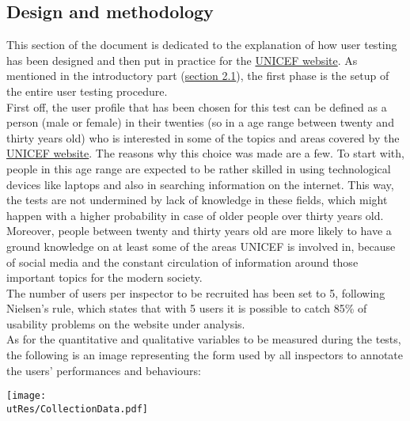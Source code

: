 
\subsection{Design and methodology}
This section of the document is dedicated to the explanation of how user testing has been designed and then put in practice for the \href{https://www.unicef.org/}{UNICEF website}.
As mentioned in the introductory part (\hyperref[subsec:introUT]{section 2.1}), the first phase is the setup of the entire user testing procedure.\\
First off, the user profile that has been chosen for this test can be defined as a person (male or female) in their twenties (so in a age range between twenty and thirty years old) who is interested in some of the topics and areas covered by the \href{https://www.unicef.org/}{UNICEF website}. The reasons why this choice was made are a few. To start with, people in this age range are expected to be rather skilled in using technological devices like laptops and also in searching information on the internet. This way, the tests are not undermined by lack of knowledge in these fields, which might happen with a higher probability in case of older people over thirty years old. Moreover, people between twenty and thirty years old are more likely to have a ground knowledge on at least some of the areas UNICEF is involved in, because of social media and the constant circulation of information around those important topics for the modern society.\\
The number of users per inspector to be recruited has been set to 5, following Nielsen's rule, which states that with 5 users it is possible to catch 85\% of usability problems on the website under analysis.\\
As for the quantitative and qualitative variables to be measured during the tests, the following is an image representing the form used by all inspectors to annotate the users' performances and behaviours:

\begin{center}
	\texttt{[image: \\utRes/CollectionData.pdf]}
\end{center}

